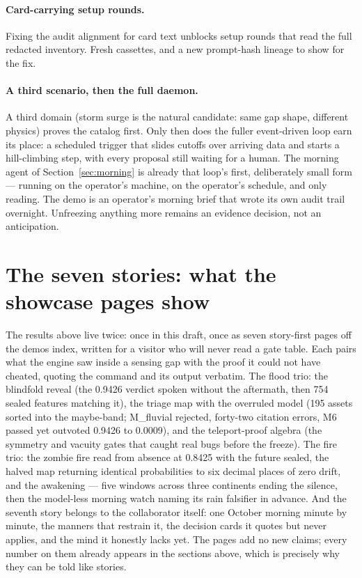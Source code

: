 \documentclass[11pt]{article}
\begin{document}
\paragraph{Card-carrying setup rounds.} Fixing the audit alignment for card
text unblocks setup rounds that read the full redacted inventory. Fresh
cassettes, and a new prompt-hash lineage to show for the fix.

\paragraph{A third scenario, then the full daemon.} A third domain (storm surge is
the natural candidate: same gap shape, different physics) proves the catalog
first. Only then does the fuller event-driven loop earn its place: a scheduled
trigger that slides cutoffs over arriving data and starts a hill-climbing
step, with every proposal still waiting for a human. The morning
agent of Section~\ref{sec:morning} is already that loop's first, deliberately
small form — running on the operator's machine, on the operator's schedule,
and only reading. The demo is an
operator's morning brief that wrote its own audit trail overnight. Unfreezing
anything more remains an evidence decision, not an anticipation.

\section{The seven stories: what the showcase pages show}
\label{sec:showcase}

The results above live twice: once in this draft, once as seven story-first
pages off the demos index, written for a visitor who will never read a gate
table. Each pairs what the engine saw inside a sensing gap with the proof it
could not have cheated, quoting the command and its output verbatim. The flood
trio: the blindfold reveal (the 0.9426 verdict spoken without the aftermath,
then 754 sealed features matching it), the triage map with the overruled model
(195 assets sorted into the maybe-band; M\_fluvial rejected, forty-two
citation errors, M6 passed yet outvoted 0.9426 to 0.0009), and the teleport-proof
algebra (the symmetry and vacuity gates that caught real bugs before the
freeze). The fire trio: the zombie fire read from absence at 0.8425 with the
future sealed, the halved map returning identical probabilities to six decimal
places of zero drift, and the awakening --- five windows across three
continents ending the silence, then the model-less morning watch naming its
rain falsifier in advance. And the seventh story belongs to the collaborator
itself: one October morning minute by minute, the manners that restrain it,
the decision cards it quotes but never applies, and the mind it honestly lacks
yet. The pages add no new claims; every number on them
already appears in the sections above, which is precisely why they can be
told like stories.
\end{document}

